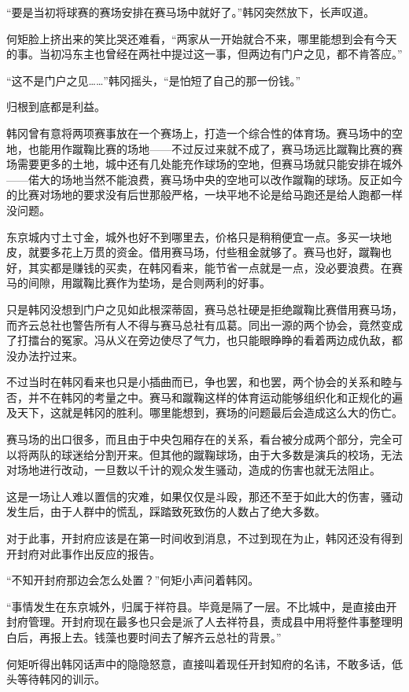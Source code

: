 “要是当初将球赛的赛场安排在赛马场中就好了。”韩冈突然放下，长声叹道。

何矩脸上挤出来的笑比哭还难看，“两家从一开始就合不来，哪里能想到会有今天的事。当初冯东主也曾经在两社中提过这一事，但两边有门户之见，都不肯答应。”

“这不是门户之见……”韩冈摇头，“是怕短了自己的那一份钱。”

归根到底都是利益。

韩冈曾有意将两项赛事放在一个赛场上，打造一个综合性的体育场。赛马场中的空地，也能用作蹴鞠比赛的场地——不过反过来就不成了，赛马场远比蹴鞠比赛的赛场需要更多的土地，城中还有几处能充作球场的空地，但赛马场就只能安排在城外——偌大的场地当然不能浪费，赛马场中央的空地可以改作蹴鞠的球场。反正如今的比赛对场地的要求没有后世那般严格，一块平地不论是给马跑还是给人跑都一样没问题。

东京城内寸土寸金，城外也好不到哪里去，价格只是稍稍便宜一点。多买一块地皮，就要多花上万贯的资金。借用赛马场，付些租金就够了。赛马也好，蹴鞠也好，其实都是赚钱的买卖，在韩冈看来，能节省一点就是一点，没必要浪费。在赛马的间隙，用蹴鞠比赛作为垫场，是合则两利的好事。

只是韩冈没想到门户之见如此根深蒂固，赛马总社硬是拒绝蹴鞠比赛借用赛马场，而齐云总社也警告所有人不得与赛马总社有瓜葛。同出一源的两个协会，竟然变成了打擂台的冤家。冯从义在旁边使尽了气力，也只能眼睁睁的看着两边成仇敌，都没办法拧过来。

不过当时在韩冈看来也只是小插曲而已，争也罢，和也罢，两个协会的关系和睦与否，并不在韩冈的考量之中。赛马和蹴鞠这样的体育运动能够组织化和正规化的遍及天下，这就是韩冈的胜利。哪里能想到，赛场的问题最后会造成这么大的伤亡。

赛马场的出口很多，而且由于中央包厢存在的关系，看台被分成两个部分，完全可以将两队的球迷给分割开来。但其他的蹴鞠球场，由于大多数是演兵的校场，无法对场地进行改动，一旦数以千计的观众发生骚动，造成的伤害也就无法阻止。

这是一场让人难以置信的灾难，如果仅仅是斗殴，那还不至于如此大的伤害，骚动发生后，由于人群中的慌乱，踩踏致死致伤的人数占了绝大多数。

对于此事，开封府应该是在第一时间收到消息，不过到现在为止，韩冈还没有得到开封府对此事作出反应的报告。

“不知开封府那边会怎么处置？”何矩小声问着韩冈。

“事情发生在东京城外，归属于祥符县。毕竟是隔了一层。不比城中，是直接由开封府管理。开封府现在最多也只会是派了人去祥符县，责成县中用将整件事整理明白后，再报上去。钱藻也要时间去了解齐云总社的背景。”

何矩听得出韩冈话声中的隐隐怒意，直接叫着现任开封知府的名讳，不敢多话，低头等待韩冈的训示。

